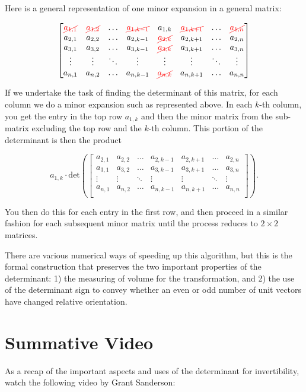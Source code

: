 \documentclass{ximera}
\begin{document}
Here is a general representation of one minor expansion in a general matrix:

$$
\begin{bmatrix}
    \textcolor{red}{\cancel{a_{1,1}}} & \textcolor{red}{\cancel{a_{1,2}}} & \ldots & \textcolor{red}{\cancel{a_{1,k-1}}} & a_{1,k} & \textcolor{red}{\cancel{a_{1,k+1}}} & \ldots & \textcolor{red}{\cancel{a_{1,n}}} \\
    a_{2,1} & a_{2,2} & \ldots & a_{2,k-1} & \textcolor{red}{\cancel{a_{2,k}}} & a_{2,k+1} & \ldots & a_{2,n} \\
    a_{3,1} & a_{3,2} & \ldots & a_{3,k-1} & \textcolor{red}{\cancel{a_{3,k}}} & a_{3,k+1} & \ldots & a_{3,n} \\
    \vdots & \vdots & \ddots & \vdots & \vdots & \vdots & \ddots & \vdots \\
    a_{n,1} & a_{n,2} & \ldots & a_{n,k-1} & \textcolor{red}{\cancel{a_{n,k}}} & a_{n,k+1} & \ldots & a_{n,n} \\
\end{bmatrix}
$$

If we undertake the task of finding the determinant of this matrix, for each column we do a minor expansion such as represented above. In each $k$-th column, you get the entry in the top row $a_{1,k}$ and then the minor matrix from the sub-matrix excluding the top row and the $k$-th column. This portion of the determinant is then the product

$$a_{1,k}\cdot\mbox{det}\left(
\begin{bmatrix}
    a_{2,1} & a_{2,2} & \ldots & a_{2,k-1} & a_{2,k+1} & \ldots & a_{2,n} \\
    a_{3,1} & a_{3,2} & \ldots & a_{3,k-1} & a_{3,k+1} & \ldots & a_{3,n} \\
    \vdots & \vdots & \ddots & \vdots & \vdots  & \ddots & \vdots \\
    a_{n,1} & a_{n,2} & \ldots & a_{n,k-1} & a_{n,k+1} & \ldots & a_{n,n} \\
\end{bmatrix}
\right).$$

You then do this for each entry in the first row, and then proceed in a similar fashion for each subsequent minor matrix until the process reduces to $2\times 2$ matrices. 

There are various numerical ways of speeding up this algorithm, but this is the formal construction that preserves the two important properties of the determinant: 1) the measuring of volume for the transformation, and 2) the use of the determinant sign to convey whether an even or odd number of unit vectors have changed relative orientation. 

\section*{Summative Video}

As a recap of the important aspects and uses of the determinant for invertibility, watch the following video by Grant Sanderson:

\begin{center}
\end{center}
\end{document}
